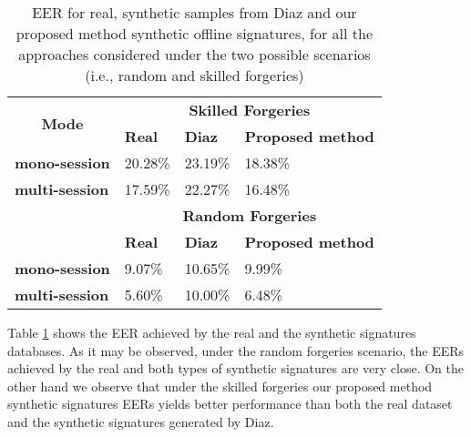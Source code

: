 \begin{table}[!htb]
\renewcommand{\arraystretch}{1.3}
\caption{EER for real, synthetic samples from Diaz \cite{diaz2014generation} and our proposed method synthetic offline signatures, for all the approaches considered under the two possible scenarios (i.e., random and skilled forgeries)}
\label{exp1_results_table}
\centering
\begin{tabular}{|l|l|l|l|}
	\hline
	\multicolumn{1}{|c|}{\multirow{2}{*}{\textbf{Mode}}} & \multicolumn{3}{c|}{\textbf{Skilled Forgeries}}          \\ \cline{2-4} 
	\multicolumn{1}{|c|}{}                               & \textbf{Real} & \textbf{Diaz} & \textbf{Proposed method} \\ \hline
	\textbf{mono-session}                                & 20.28\%            & 23.19\%            & 18.38\%                       \\ \hline
	\textbf{multi-session}                               & 17.59\%            & 22.27\%            & 16.48\%                       \\ \hline
	\multirow{2}{*}{}                                    & \multicolumn{3}{c|}{\textbf{Random Forgeries}}           \\ \cline{2-4} 
	& \textbf{Real} & \textbf{Diaz} & \textbf{Proposed method} \\ \hline
	\textbf{mono-session}                                & 9.07\%            & 10.65\%            & 9.99\%                       \\ \hline
	\textbf{multi-session}                               & 5.60\%            & 10.00\%            & 6.48\%                       \\ \hline
\end{tabular}

\end{table}

Table \ref{exp1_results_table} shows the EER achieved by the
real and the synthetic signatures databases. As it
may be observed, under the random forgeries scenario, the
EERs achieved by the real and both types of synthetic signatures
are very close. On the other hand we observe that under the skilled forgeries our proposed method synthetic signatures EERs yields better performance than both the real dataset and the synthetic signatures generated by Diaz.

